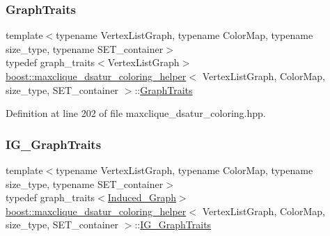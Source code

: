 \subsubsection{\texorpdfstring{Graph\+Traits}{GraphTraits}}
{\footnotesize\ttfamily template$<$typename Vertex\+List\+Graph, typename Color\+Map, typename size\+\_\+type, typename S\+E\+T\+\_\+container$>$ \\
typedef graph\+\_\+traits$<$Vertex\+List\+Graph$>$ \hyperlink{classboost_1_1maxclique__dsatur__coloring__helper}{boost\+::maxclique\+\_\+dsatur\+\_\+coloring\+\_\+helper}$<$ Vertex\+List\+Graph, Color\+Map, size\+\_\+type, S\+E\+T\+\_\+container $>$\+::\hyperlink{classboost_1_1maxclique__dsatur__coloring__helper_a6f1b584e178237affdd69676e51eb316}{Graph\+Traits}\hspace{0.3cm}{\ttfamily [private]}}



Definition at line 202 of file maxclique\+\_\+dsatur\+\_\+coloring.\+hpp.

\mbox{\label{classboost_1_1maxclique__dsatur__coloring__helper_a7e7d643710dac81b6aedfd442d226424}} 
\subsubsection{\texorpdfstring{I\+G\+\_\+\+Graph\+Traits}{IG\_GraphTraits}}
{\footnotesize\ttfamily template$<$typename Vertex\+List\+Graph, typename Color\+Map, typename size\+\_\+type, typename S\+E\+T\+\_\+container$>$ \\
typedef graph\+\_\+traits$<$\hyperlink{classboost_1_1maxclique__dsatur__coloring__helper_a2928978558b9545fe58e467dd8adf0e5}{Induced\+\_\+\+Graph}$>$ \hyperlink{classboost_1_1maxclique__dsatur__coloring__helper}{boost\+::maxclique\+\_\+dsatur\+\_\+coloring\+\_\+helper}$<$ Vertex\+List\+Graph, Color\+Map, size\+\_\+type, S\+E\+T\+\_\+container $>$\+::\hyperlink{classboost_1_1maxclique__dsatur__coloring__helper_a7e7d643710dac81b6aedfd442d226424}{I\+G\+\_\+\+Graph\+Traits}\hspace{0.3cm}{\ttfamily [private]}}



